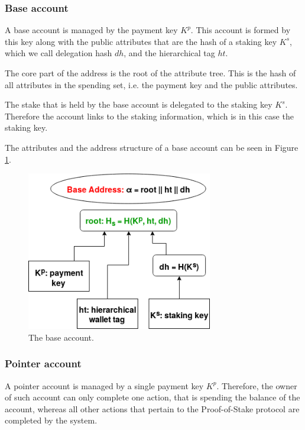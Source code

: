 \subsubsection{Base account}\label{subsubsec:base_account_v2}

A base account is managed by the payment key $K^p$. This account is formed by this key along with the public attributes that are the hash of a staking key $K^s$, which we call delegation hash $dh$, and the hierarchical tag $ht$.

The core part of the address is the root of the attribute tree. This is the hash of all attributes in the spending set, i.e. the payment key and the public attributes.

The stake that is held by the base account is delegated to the staking key $K^s$. Therefore the account links to the staking information, which is in this case the staking key.

The attributes and the address structure of a base account can be seen in Figure \ref{fig:base_account_v2}.

\begin{figure}
  \begin{center}
    \includegraphics[width=230pt]{figures/base_account_v2.png}
  \end{center}
  \caption{The base account.}
  \label{fig:base_account_v2}
\end{figure}

\subsubsection{Pointer account}\label{subsubsec:pointer_account}

A pointer account is managed by a single payment key $K^p$. Therefore, the owner of such account can only complete one action, that is spending the balance of the account, whereas all other actions that pertain to the Proof-of-Stake protocol are completed by the system.

